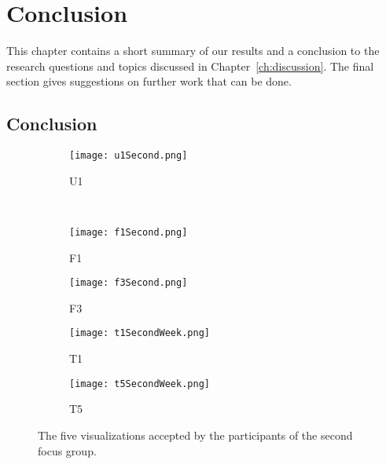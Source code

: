 \chapter{Conclusion}
This chapter contains a short summary of our results and a conclusion to the research questions and topics discussed in Chapter~\ref{ch:discussion}. The final section gives suggestions on further work that can be done.

\section{Conclusion}
\begin{figure}[h!]
  \begin{subfigure}[b]{0.4\textwidth}
    \centering
    \texttt{[image: u1Second.png]}
    \caption{U1}
  \end{subfigure} 
  \\
  \begin{subfigure}[b]{0.49\textwidth}
    \centering
    \texttt{[image: f1Second.png]}
    \caption{F1}
  \end{subfigure} 
  \begin{subfigure}[b]{0.49\textwidth}
    \centering
    \texttt{[image: f3Second.png]}
    \caption{F3}
  \end{subfigure}
  \begin{subfigure}[b]{0.49\textwidth}
    \centering
    \texttt{[image: t1SecondWeek.png]}
    \caption{T1}
  \end{subfigure} 
  \begin{subfigure}[b]{0.49\textwidth}
    \centering
    \texttt{[image: t5SecondWeek.png]}
    \caption{T5}
  \end{subfigure}
  \caption[Accepted visualizations]{The five visualizations accepted by the participants of the second focus group.}
  \label{fig:visualizations}
\end{figure}

